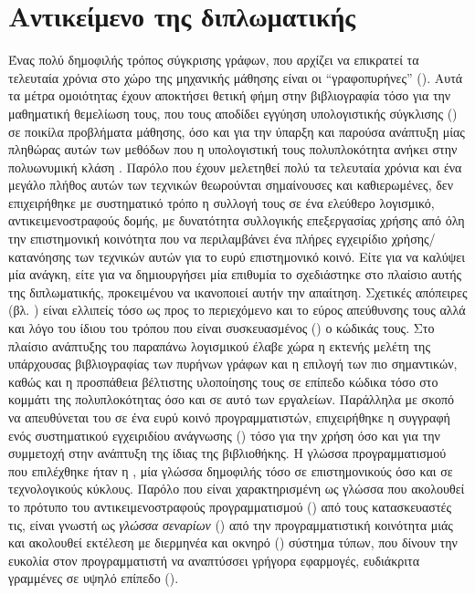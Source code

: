 \section{Αντικείμενο της διπλωματικής}
Ένας πολύ δημοφιλής τρόπος σύγκρισης γράφων, που αρχίζει να επικρατεί τα τελευταία χρόνια στο χώρο της μηχανικής μάθησης είναι οι ``γραφοπυρήνες'' ().
Αυτά τα μέτρα ομοιότητας έχουν αποκτήσει θετική φήμη στην βιβλιογραφία τόσο για την μαθηματική θεμελίωση τους, που τους αποδίδει εγγύηση υπολογιστικής σύγκλισης () σε ποικίλα προβλήματα μάθησης, όσο και για την ύπαρξη και παρούσα ανάπτυξη μίας πληθώρας αυτών των μεθόδων που η υπολογιστική τους πολυπλοκότητα ανήκει στην πολυωνυμική κλάση .
Παρόλο που έχουν μελετηθεί πολύ τα τελευταία χρόνια και ένα μεγάλο πλήθος αυτών των τεχνικών θεωρούνται σημαίνουσες και καθιερωμένες, δεν επιχειρήθηκε με συστηματικό τρόπο η συλλογή τους σε ένα ελεύθερο λογισμικό, αντικειμενοστραφούς δομής, με δυνατότητα συλλογικής επεξεργασίας χρήσης από όλη την επιστημονική κοινότητα που να περιλαμβάνει ένα πλήρες εγχειρίδιο χρήσης/κατανόησης των τεχνικών αυτών για το ευρύ επιστημονικό κοινό.
Είτε για να καλύψει μία ανάγκη, είτε για να δημιουργήσει μία επιθυμία το \textbf{} σχεδιάστηκε στο πλαίσιο αυτής της διπλωματικής, προκειμένου να ικανοποιεί αυτήν την απαίτηση.
Σχετικές απόπειρες (βλ. \cite{sugiyama2017graphkernels}) είναι ελλιπείς τόσο ως προς το περιεχόμενο και το εύρος απεύθυνσης τους αλλά και λόγο του ίδιου του τρόπου που είναι συσκευασμένος () ο κώδικάς τους.
Στο πλαίσιο ανάπτυξης του παραπάνω λογισμικού έλαβε χώρα η εκτενής μελέτη της υπάρχουσας βιβλιογραφίας των πυρήνων γράφων και η επιλογή των πιο σημαντικών, καθώς και η προσπάθεια βέλτιστης υλοποίησης τους σε επίπεδο κώδικα τόσο στο κομμάτι της πολυπλοκότητας όσο και σε αυτό των εργαλείων.
Παράλληλα με σκοπό να απευθύνεται του σε ένα ευρύ κοινό προγραμματιστών, επιχειρήθηκε η συγγραφή ενός συστηματικού εγχειριδίου ανάγνωσης () τόσο για την χρήση όσο και για την συμμετοχή στην ανάπτυξη της ίδιας της βιβλιοθήκης.
Η γλώσσα προγραμματισμού που επιλέχθηκε ήταν η , μία γλώσσα δημοφιλής τόσο σε επιστημονικούς όσο και σε τεχνολογικούς κύκλους.
Παρόλο που είναι χαρακτηρισμένη ως γλώσσα που ακολουθεί το πρότυπο του αντικειμενοστραφούς προγραμματισμού () από τους κατασκευαστές τις, είναι γνωστή ως \textit{γλώσσα σεναρίων} () από την προγραμματιστική κοινότητα μιάς και ακολουθεί εκτέλεση με διερμηνέα και οκνηρό () σύστημα τύπων, που δίνουν την ευκολία στον προγραμματιστή να αναπτύσσει γρήγορα  εφαρμογές, ευδιάκριτα γραμμένες σε υψηλό επίπεδο ().
